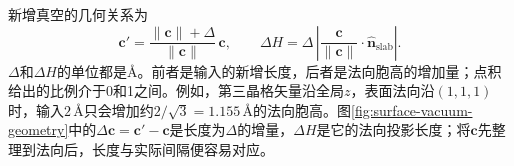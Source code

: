新增真空的几何关系为
\begin{equation}
  \mathbf c'=
  \frac{\|\mathbf c\|+\Delta}{\|\mathbf c\|}\,\mathbf c,
  \qquad
  \Delta H=\Delta\,
  \left|\frac{\mathbf c}{\|\mathbf c\|}\cdot\hat{\mathbf n}_{\mathrm{slab}}\right|.
  \label{eq:vacuum-addition-projection}
\end{equation}
$\Delta$和$\Delta H$的单位都是\AA。前者是输入的新增长度，后者是法向胞高的增加量；点积给出的比例介于0和1之间。例如，第三晶格矢量沿全局$z$，表面法向沿$(1,1,1)$时，输入$2\,\text{\AA}$只会增加约$2/\sqrt{3}=1.155\,\text{\AA}$的法向胞高。图\ref{fig:surface-vacuum-geometry}中的$\Delta\mathbf c=\mathbf c'-\mathbf c$是长度为$\Delta$的增量，$\Delta H$是它的法向投影长度；将$\mathbf c$先整理到法向后，长度与实际间隔便容易对应。

